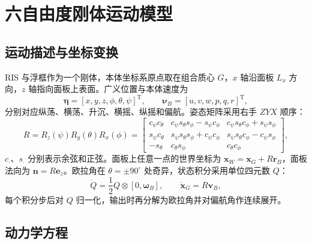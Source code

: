 \section{六自由度刚体运动模型}
\label{sec:c3_6dof}

\subsection{运动描述与坐标变换}

RIS 与浮框作为一个刚体，本体坐标系原点取在组合质心 $G$，$x$ 轴沿面板 $L_x$ 方向，$z$ 轴指向面板上表面。广义位置与本体速度为
\begin{equation}
\boldsymbol\eta=[x,y,z,\phi,\theta,\psi]^{\mathrm T},\qquad
\boldsymbol\nu_B=[u,v,w,p,q,r]^{\mathrm T},
\label{eq:c3_eta}
\end{equation}
分别对应纵荡、横荡、升沉、横摇、纵摇和偏航。姿态矩阵采用右手 $ZYX$ 顺序：
\begin{equation}
R=R_z(\psi)R_y(\theta)R_x(\phi)=
\begin{bmatrix}
c_\psi c_\theta & c_\psi s_\theta s_\phi-s_\psi c_\phi & c_\psi s_\theta c_\phi+s_\psi s_\phi\\
s_\psi c_\theta & s_\psi s_\theta s_\phi+c_\psi c_\phi & s_\psi s_\theta c_\phi-c_\psi s_\phi\\
-s_\theta & c_\theta s_\phi & c_\theta c_\phi
\end{bmatrix},
\label{eq:c3_rotation}
\end{equation}
$c_\cdot$、$s_\cdot$ 分别表示余弦和正弦。面板上任意一点的世界坐标为 $\mathbf x_W=\mathbf x_G+R\mathbf r_B$，面板法向为 $\mathbf n=R\mathbf e_z$。欧拉角在 $\theta=\pm90^\circ$ 处奇异，状态积分采用单位四元数 $Q$：
\begin{equation}
\dot Q=\frac12Q\otimes[0,\boldsymbol\omega_B],\qquad \dot{\mathbf x}_G=R\mathbf v_B,
\label{eq:c3_quaternion}
\end{equation}
每个积分步后对 $Q$ 归一化，输出时再分解为欧拉角并对偏航角作连续展开。

\subsection{动力学方程}

